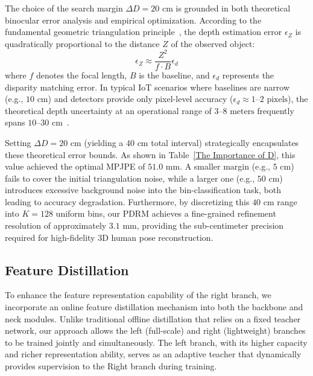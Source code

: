 \documentclass[journal]{IEEEtran}
\begin{document}
The choice of the search margin $\Delta D = 20 \text{ cm}$ is grounded in both theoretical binocular error analysis and empirical optimization. According to the fundamental geometric triangulation principle~, the depth estimation error $\epsilon_Z$ is quadratically proportional to the distance $Z$ of the observed object:
\begin{equation}
\epsilon_Z \approx \frac{Z^2}{f \cdot B} \epsilon_d
\end{equation}
where $f$ denotes the focal length, $B$ is the baseline, and $\epsilon_d$ represents the disparity matching error. In typical IoT scenarios where baselines are narrow (e.g., $10 \text{ cm}$) and detectors provide only pixel-level accuracy ($\epsilon_d \approx 1\text{--}2 \text{ pixels}$), the theoretical depth uncertainty at an operational range of $3\text{--}8 \text{ meters}$ frequently spans $10\text{--}30 \text{ cm}$~.

Setting $\Delta D = 20 \text{ cm}$ (yielding a $40 \text{ cm}$ total interval) strategically encapsulates these theoretical error bounds. As shown in Table~\ref{The Importance of D}, this value achieved the optimal MPJPE of $51.0 \text{ mm}$. A smaller margin (e.g., $5 \text{ cm}$) fails to cover the initial triangulation noise, while a larger one (e.g., $50 \text{ cm}$) introduces excessive background noise into the bin-classification task, both leading to accuracy degradation. Furthermore, by discretizing this $40 \text{ cm}$ range into $K=128$ uniform bins, our PDRM achieves a fine-grained refinement resolution of approximately $3.1 \text{ mm}$, providing the sub-centimeter precision required for high-fidelity 3D human pose reconstruction.



\subsection{Feature Distillation}

To enhance the feature representation capability of the right branch, we incorporate an online feature distillation mechanism into both the backbone and neck modules. Unlike traditional offline distillation that relies on a fixed teacher network, our approach allows the left (full-scale) and right (lightweight) branches to be trained jointly and simultaneously. The left branch, with its higher capacity and richer representation ability, serves as an adaptive teacher that dynamically provides supervision to the Right branch during training.
\end{document}
